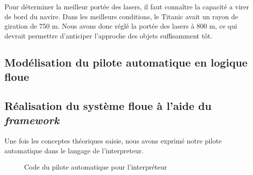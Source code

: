 \documentclass[a4paper,11pt]{article}
\begin{document}
    Pour déterminer la meilleur portée des lasers, il faut connaître la capacité a virer de bord du navire. Dans les meilleurs conditions, le Titanic avait un rayon de giration de 750 m. Nous avons donc réglé la portée des lasers à 800 m, ce qui devrait permettre d’anticiper l’approche des objets suffisamment tôt.

    \subsection{Modélisation du pilote automatique en logique floue}

    \subsection{Réalisation du système floue à l'aide du \textit{framework}}

    Une fois les conceptes théoriques saisie, nous avons exprimé notre pilote automatique dans le langage de l'interpreteur.

    \begin{figure}[H]
        \begin{center}
            \caption{Code du pilote automatique pour l’interpréteur}
            
            \label{fig:codeAutoPilot}
        \end{center}
    \end{figure}
\end{document}
